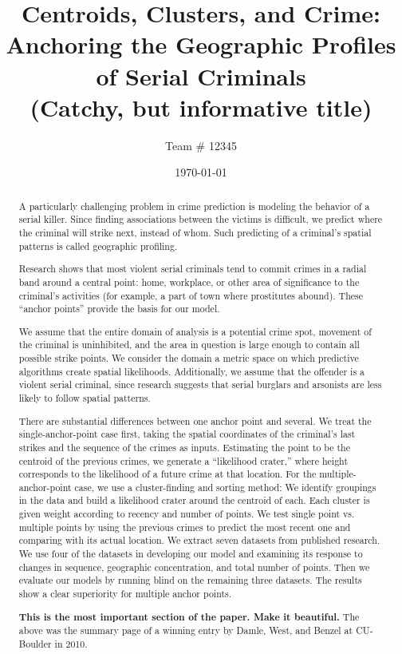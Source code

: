 \documentclass[pre,12pt]{revtex4-1}
\begin{document}
\title{Centroids, Clusters, and Crime: Anchoring the Geographic Profiles of Serial Criminals \\(\textbf{Catchy, but informative title})}
\author{Team \# 12345}
\date{\today}

\begin{abstract}
A particularly challenging problem in crime prediction is modeling the behavior of a serial killer. Since finding associations between the victims is difficult, we predict where the criminal will strike next, instead of whom. Such predicting of a criminal's spatial patterns is called geographic profiling.

Research shows that most violent serial criminals tend to commit crimes in a radial band around a central point: home, workplace, or other area of significance to the criminal's activities (for example, a part of town where prostitutes abound). These ``anchor points'' provide the basis for our model.

We assume that the entire domain of analysis is a potential crime spot, movement of the criminal is uninhibited, and the area in question is large enough to contain all possible strike points. We consider the domain a metric space on which predictive algorithms create spatial likelihoods. Additionally, we assume that the offender is a violent serial criminal, since research suggests that serial burglars and arsonists are less likely to follow spatial patterns.

There are substantial differences between one anchor point and several. We treat the single-anchor-point case first, taking the spatial coordinates of the criminal's last strikes and the sequence of the crimes as inputs. Estimating the point to be the centroid of the previous crimes, we generate a ``likelihood crater,'' where height corresponds to the likelihood of a future crime at that location. For the multiple-anchor-point case, we use a cluster-finding and sorting method: We identify groupings in the data and build a likelihood crater around the centroid of each. Each cluster is given weight according to recency and number of points. We test single point vs. multiple points by using the previous crimes to predict the most recent one and comparing with its actual location.
We extract seven datasets from published research. We use four of the datasets in developing our model and examining its response to changes in sequence, geographic concentration, and total number of points. Then we evaluate our models by running blind on the remaining three datasets.
The results show a clear superiority for multiple anchor points.

\textbf{This is the most important section of the paper. Make it beautiful.} The above was the summary page of a winning entry by Damle, West, and Benzel at CU-Boulder in 2010.
\end{abstract}
\maketitle
\end{document}
